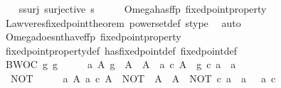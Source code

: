 \begin{isabellebody}
\ \ \isamarkupfalse%
\ s{\isacharunderscore}{\kern0pt}surj{\isacharcolon}{\kern0pt}\ {\isachardoublequoteopen}surjective\ s{\isachardoublequoteclose}\isanewline
\ \ \isamarkupfalse%
\ \isamarkupfalse%
\ Omega{\isacharunderscore}{\kern0pt}has{\isacharunderscore}{\kern0pt}ffp{\isacharcolon}{\kern0pt}\ {\isachardoublequoteopen}fixed{\isacharunderscore}{\kern0pt}point{\isacharunderscore}{\kern0pt}property\ {\isasymOmega}{\isachardoublequoteclose}\isanewline
\ \ \ \ \isamarkupfalse%
\ Lawveres{\isacharunderscore}{\kern0pt}fixed{\isacharunderscore}{\kern0pt}point{\isacharunderscore}{\kern0pt}theorem\ powerset{\isacharunderscore}{\kern0pt}def\ s{\isacharunderscore}{\kern0pt}type\ \isamarkupfalse%
\ auto\isanewline
\ \ \isamarkupfalse%
\ Omega{\isacharunderscore}{\kern0pt}doesnt{\isacharunderscore}{\kern0pt}have{\isacharunderscore}{\kern0pt}ffp{\isacharcolon}{\kern0pt}\ {\isachardoublequoteopen}{\isasymnot}{\isacharparenleft}{\kern0pt}fixed{\isacharunderscore}{\kern0pt}point{\isacharunderscore}{\kern0pt}property\ {\isasymOmega}{\isacharparenright}{\kern0pt}{\isachardoublequoteclose}\isanewline
\ \ \ \ \isamarkupfalse%
\ fixed{\isacharunderscore}{\kern0pt}point{\isacharunderscore}{\kern0pt}property{\isacharunderscore}{\kern0pt}def\ has{\isacharunderscore}{\kern0pt}fixed{\isacharunderscore}{\kern0pt}point{\isacharunderscore}{\kern0pt}def\ fixed{\isacharunderscore}{\kern0pt}point{\isacharunderscore}{\kern0pt}def\isanewline
\ \ \isamarkupfalse%
\ \ \ \ \isanewline
\ \ \ \ \isamarkupfalse%
\ BWOC{\isacharcolon}{\kern0pt}\ {\isachardoublequoteopen}{\isasymforall}g{\isachardot}{\kern0pt}\ g\ {\isacharcolon}{\kern0pt}\ {\isasymOmega}\ {\isasymrightarrow}\ {\isasymOmega}\ {\isasymlongrightarrow}\ {\isacharparenleft}{\kern0pt}{\isasymexists}a\ A{\isachardot}{\kern0pt}\ g\ {\isacharcolon}{\kern0pt}\ A\ {\isasymrightarrow}\ A\ {\isasymand}\ a\ {\isasymin}\isactrlsub c\ A\ {\isasymand}\ g\ {\isasymcirc}\isactrlsub c\ a\ {\isacharequal}{\kern0pt}\ a{\isacharparenright}{\kern0pt}{\isachardoublequoteclose}\isanewline
\ \ \ \ \isamarkupfalse%
\ \ {\isachardoublequoteopen}NOT\ {\isacharcolon}{\kern0pt}\ {\isasymOmega}\ {\isasymrightarrow}\ {\isasymOmega}\ {\isasymand}\ {\isacharparenleft}{\kern0pt}{\isasymforall}a{\isachardot}{\kern0pt}\ {\isasymforall}A{\isachardot}{\kern0pt}\ a\ {\isasymin}\isactrlsub c\ A\ {\isasymlongrightarrow}\ NOT\ {\isacharcolon}{\kern0pt}\ A\ {\isasymrightarrow}\ A\ {\isasymlongrightarrow}\ NOT\ {\isasymcirc}\isactrlsub c\ a\ {\isasymnoteq}\ a\ {\isasymor}\ {\isasymnot}\ a\ {\isasymin}\isactrlsub c\ {\isasymOmega}{\isacharparenright}{\kern0pt}{\isachardoublequoteclose}\isanewline

\end{isabellebody}
